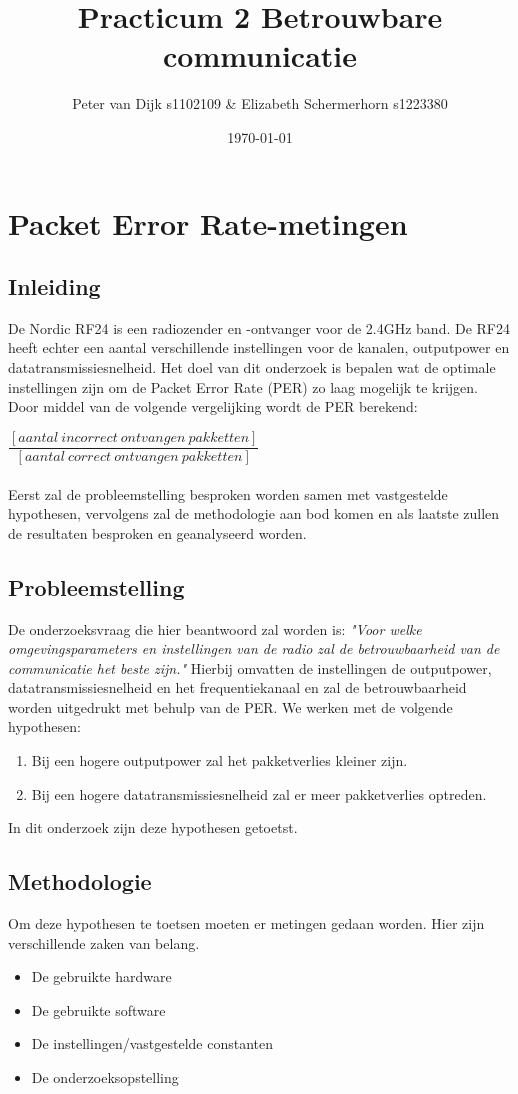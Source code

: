 \documentclass{article}
\author{Peter van Dijk s1102109 \& Elizabeth Schermerhorn s1223380}
\date{\today}
\title{Practicum 2 Betrouwbare communicatie}
\begin{document}
\maketitle
\newpage
\tableofcontents
\clearpage
\section{Packet Error Rate-metingen}
\label{PER}
\subsection{Inleiding}
De Nordic RF24 is een radiozender en -ontvanger voor de 2.4GHz band. De RF24 heeft echter een aantal verschillende instellingen voor de kanalen, outputpower en datatransmissiesnelheid. Het doel van dit onderzoek is bepalen wat de optimale instellingen zijn om de Packet Error Rate (PER) zo laag mogelijk te krijgen. Door middel van de volgende vergelijking wordt de PER berekend: 
\setlength{\parskip}{10pt plus 1pt minus 1pt}

$\dfrac {[aantal\ incorrect\ ontvangen\ pakketten]}{[aantal\ correct\ ontvangen\ pakketten]}$\\
\\
Eerst zal de probleemstelling besproken worden samen met vastgestelde hypothesen, vervolgens zal de methodologie aan bod komen en als laatste zullen de resultaten besproken en geanalyseerd worden. 

\subsection{Probleemstelling}
De onderzoeksvraag die hier beantwoord zal worden is: \textit{"Voor welke omgevingsparameters en instellingen van de radio zal de betrouwbaarheid van de communicatie het beste zijn."} Hierbij omvatten de instellingen de outputpower, datatransmissiesnelheid en het frequentiekanaal en zal de betrouwbaarheid worden uitgedrukt met behulp van de PER. We werken met de volgende hypothesen: 
\begin{enumerate}
  \item Bij een hogere outputpower zal het pakketverlies kleiner zijn.
  \item Bij een hogere datatransmissiesnelheid zal er meer pakketverlies optreden. 
\end{enumerate}
In dit onderzoek zijn deze hypothesen getoetst.

\subsection{Methodologie}
Om deze hypothesen te toetsen moeten er metingen gedaan worden. Hier zijn verschillende zaken van belang. 
\begin{itemize}
	\item De gebruikte hardware
	\item De gebruikte software
	\item De instellingen/vastgestelde constanten
	\item De onderzoeksopstelling
\end{itemize}
\end{document}

